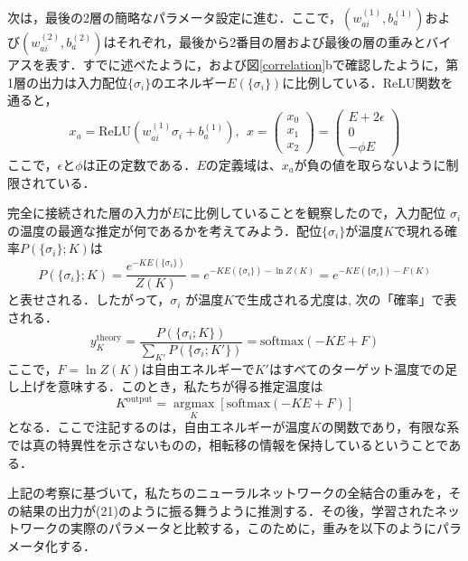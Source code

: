 \documentclass[a4paper,11pt]{jsarticle}
\begin{document}
次は，最後の2層の簡略なパラメータ設定に進む．ここで，$(w_{ai}^{(1)}, b_a^{(1)})$および$(w_{ai}^{(2)}, b_a^{(2)})$はそれぞれ，最後から2番目の層および最後の層の重みとバイアスを表す．すでに述べたように，および図\ref{correlation}bで確認したように，第1層の出力は入力配位$\{ \sigma_i \}$のエネルギー$E(\{ \sigma_i \})$に比例している．ReLU関数を通ると，
\begin{equation}
  x_a = \text{ReLU}(w_{ai}^{(1)}\sigma_i + b_a^{(1)}), \ \
  x = \begin{pmatrix} x_0 \\ x_1 \\ x_2 \end{pmatrix}
  = \begin{pmatrix} E+2\epsilon \\ 0 \\ -\phi E \end{pmatrix}
\end{equation}
ここで，$\epsilon$と$\phi$は正の定数である．$E$の定義域は、$x_a$が負の値を取らないように制限されている．\par
完全に接続された層の入力が$E$に比例していることを観察したので，入力配位 ${\sigma_i}$の温度の最適な推定が何であるかを考えてみよう．配位$\{ \sigma_i \}$が温度$K$で現れる確率$P(\{ \sigma_i \} ; K )$は
\begin{equation}
  P(\{ \sigma_i \} ; K )
  = \frac{e^{-KE(\{ \sigma_i \})}}{Z(K)}
  = e^{-KE(\{ \sigma_i \}) - \ln{Z(K)}}
  = e^{-KE(\{ \sigma_i \}) - F(K)}
\end{equation}
と表せされる．したがって，${\sigma_i}$ が温度$K$で生成される尤度は,
次の「確率」で表される．
\begin{equation}
  y_K^{\text{theory}} = \frac{P(\{\sigma_i ; K \})}{\sum_{K'}P(\{\sigma_i ; K' \})} = \text{softmax}(-KE + F)
\end{equation}
ここで，$F = \ln{Z(K)}$は自由エネルギーで$K'$はすべてのターゲット温度での足し上げを意味する．このとき，私たちが得る推定温度は
\begin{equation}
  K^{\text{output}} =
  \underset{K} {\operatorname{argmax}} \left[\text{softmax}(-KE + F)\right]
\end{equation}
となる．ここで注記するのは，自由エネルギーが温度$K$の関数であり，有限な系では真の特異性を示さないものの，相転移の情報を保持しているということである．\par
上記の考察に基づいて，私たちのニューラルネットワークの全結合の重みを，その結果の出力が(21)のように振る舞うように推測する．その後，学習されたネットワークの実際のパラメータと比較する，このために，重みを以下のようにパラメータ化する．
\end{document}
